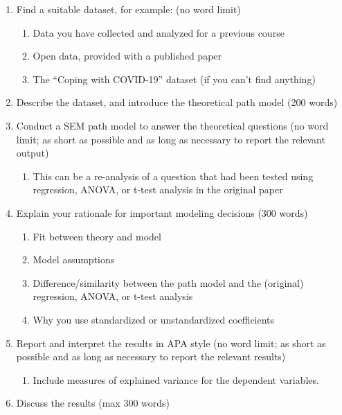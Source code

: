 \documentclass[
  letterpaper,
]{scrbook}
\providecommand{\tightlist}{%
  \setlength{\itemsep}{0pt}\setlength{\parskip}{0pt}}\usepackage{longtable,booktabs,array}
\begin{document}
\begin{enumerate}
  \begin{enumerate}
  \def\labelenumii{\alph{enumii}.}
  \tightlist
  \item
    Find a suitable dataset, for example: (no word limit)

    \begin{enumerate}
    \def\labelenumiii{\roman{enumiii}.}
    \tightlist
    \item
      Data you have collected and analyzed for a previous course
    \item
      Open data, provided with a published paper
    \item
      The ``Coping with COVID-19'' dataset (if you can't find anything)
    \end{enumerate}
  \item
    Describe the dataset, and introduce the theoretical path model (200
    words)
  \item
    Conduct a SEM path model to answer the theoretical questions (no
    word limit; as short as possible and as long as necessary to report
    the relevant output)

    \begin{enumerate}
    \def\labelenumiii{\roman{enumiii}.}
    \tightlist
    \item
      This can be a re-analysis of a question that had been tested using
      regression, ANOVA, or t-test analysis in the original paper
    \end{enumerate}
  \item
    Explain your rationale for important modeling decisions (300 words)

    \begin{enumerate}
    \def\labelenumiii{\roman{enumiii}.}
    \tightlist
    \item
      Fit between theory and model
    \item
      Model assumptions
    \item
      Difference/similarity between the path model and the (original)
      regression, ANOVA, or t-test analysis
    \item
      Why you use standardized or unstandardized coefficients
    \end{enumerate}
  \item
    Report and interpret the results in APA style (no word limit; as
    short as possible and as long as necessary to report the relevant
    results)

    \begin{enumerate}
    \def\labelenumiii{\roman{enumiii}.}
    \tightlist
    \item
      Include measures of explained variance for the dependent
      variables.
    \end{enumerate}
  \item
    Discuss the results (max 300 words)


\end{enumerate}
\end{enumerate}
\end{document}
